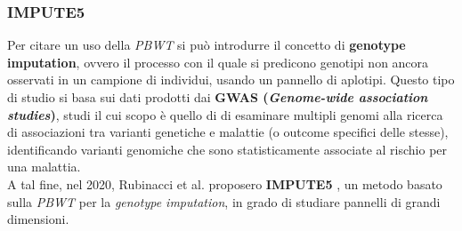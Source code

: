 \subsubsection{IMPUTE5}
Per citare un uso della \textit{PBWT} si può introdurre il concetto di
\textbf{genotype 
  imputation}, ovvero il processo con il quale si predicono genotipi non ancora
osservati in un campione di individui, usando un pannello di aplotipi. Questo
tipo di studio si basa sui dati prodotti dai \textbf{GWAS (\textit{Genome-wide
    association studies})}, studi il cui scopo è quello di di esaminare multipli
genomi alla ricerca di associazioni tra varianti genetiche e malattie (o
outcome specifici delle stesse), identificando varianti genomiche che sono
statisticamente associate al rischio per una malattia.\\ 
A tal fine, nel 2020, Rubinacci et al. proposero \textbf{IMPUTE5}
\cite{impute5}, un metodo basato sulla \textit{PBWT} per la \textit{genotype
  imputation}, in grado di studiare pannelli di grandi dimensioni.
